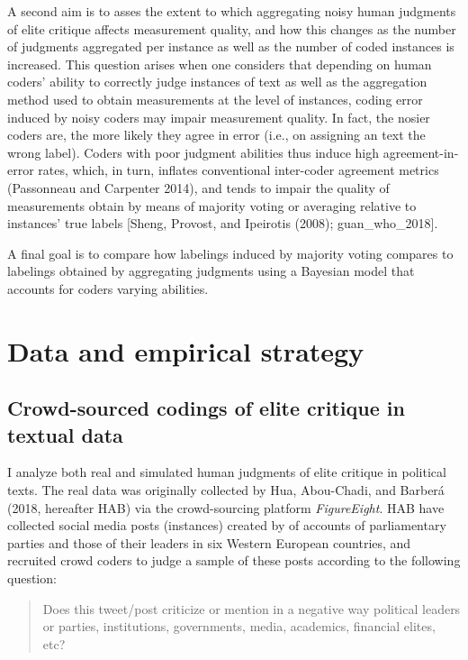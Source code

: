 \documentclass[12pt,]{article}
\begin{document}
A second aim is to asses the extent to which aggregating noisy human
judgments of elite critique affects measurement quality, and how this
changes as the number of judgments aggregated per instance as well as
the number of coded instances is increased. This question arises when
one considers that depending on human coders' ability to correctly judge
instances of text as well as the aggregation method used to obtain
measurements at the level of instances, coding error induced by noisy
coders may impair measurement quality. In fact, the nosier coders are,
the more likely they agree in error (i.e., on assigning an text the
wrong label). Coders with poor judgment abilities thus induce high
agreement-in-error rates, which, in turn, inflates conventional
inter-coder agreement metrics (Passonneau and Carpenter 2014), and tends
to impair the quality of measurements obtain by means of majority voting
or averaging relative to instances' true labels {[}Sheng, Provost, and
Ipeirotis (2008); guan\_who\_2018{]}.

A final goal is to compare how labelings induced by majority voting
compares to labelings obtained by aggregating judgments using a Bayesian
model that accounts for coders varying abilities.

\hypertarget{data-and-empirical-strategy}{%
\section{Data and empirical
strategy}\label{data-and-empirical-strategy}}

\hypertarget{crowd-sourced-codings-of-elite-critique-in-textual-data}{%
\subsection{Crowd-sourced codings of elite critique in textual
data}\label{crowd-sourced-codings-of-elite-critique-in-textual-data}}

I analyze both real and simulated human judgments of elite critique in
political texts. The real data was originally collected by Hua,
Abou-Chadi, and Barberá (2018, hereafter HAB) via the crowd-sourcing
platform \emph{FigureEight}. HAB have collected social media posts
(instances) created by of accounts of parliamentary parties and those of
their leaders in six Western European countries, and recruited crowd
coders to judge a sample of these posts according to the following
question:

\begin{quote}
Does this tweet/post criticize or mention in a negative way political
leaders or parties, institutions, governments, media, academics,
financial elites, etc?
\end{quote}
\end{document}
